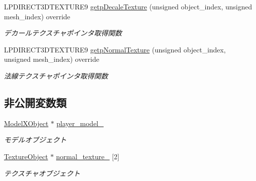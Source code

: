 \begin{DoxyCompactItemize}
L\+P\+D\+I\+R\+E\+C\+T3\+D\+T\+E\+X\+T\+U\+R\+E9 \mbox{\hyperlink{class_player_draw_ae69b46285241f390fbf62f6af2b5340d}{getp\+Decale\+Texture}} (unsigned object\+\_\+index, unsigned mesh\+\_\+index) override
\begin{DoxyCompactList}\small\item\em デカールテクスチャポインタ取得関数 \end{DoxyCompactList}\item 
L\+P\+D\+I\+R\+E\+C\+T3\+D\+T\+E\+X\+T\+U\+R\+E9 \mbox{\hyperlink{class_player_draw_a231aa618a0bf71311b61897ccf7191b8}{getp\+Normal\+Texture}} (unsigned object\+\_\+index, unsigned mesh\+\_\+index) override
\begin{DoxyCompactList}\small\item\em 法線テクスチャポインタ取得関数 \end{DoxyCompactList}\end{DoxyCompactItemize}
\subsection*{非公開変数類}
\begin{DoxyCompactItemize}
\item 
\mbox{\hyperlink{class_model_x_object}{Model\+X\+Object}} $\ast$ \mbox{\hyperlink{class_player_draw_a01943b6dec9856ef843f7afc0f8b4c02}{player\+\_\+model\+\_\+}}
\begin{DoxyCompactList}\small\item\em モデルオブジェクト \end{DoxyCompactList}\item 
\mbox{\hyperlink{class_texture_object}{Texture\+Object}} $\ast$ \mbox{\hyperlink{class_player_draw_ac106fde46e38f5ac7f33de5cc5f6fd76}{normal\+\_\+texture\+\_\+}} \mbox{[}2\mbox{]}
\begin{DoxyCompactList}\small\item\em テクスチャオブジェクト \end{DoxyCompactList}\end{DoxyCompactItemize}
